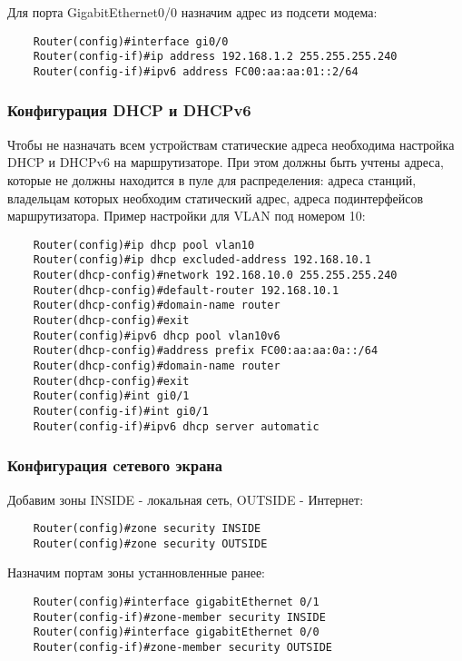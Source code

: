 Для порта GigabitEthernet0/0 назначим адрес из подсети модема:

\begin{lstlisting}
    Router(config)#interface gi0/0
    Router(config-if)#ip address 192.168.1.2 255.255.255.240
    Router(config-if)#ipv6 address FC00:aa:aa:01::2/64
\end{lstlisting}

\subsubsection{Конфигурация DHCP и DHCPv6}

Чтобы не назначать всем устройствам статические адреса необходима настройка DHCP и DHCPv6 на маршрутизаторе.
При этом должны быть учтены адреса, которые не должны находится в пуле для распределения: 
адреса станций, владельцам которых необходим статический адрес, 
адреса подинтерфейсов маршрутизатора. Пример настройки для VLAN под номером 10: 

\begin{lstlisting}
    Router(config)#ip dhcp pool vlan10
    Router(config)#ip dhcp excluded-address 192.168.10.1
    Router(dhcp-config)#network 192.168.10.0 255.255.255.240
    Router(dhcp-config)#default-router 192.168.10.1
    Router(dhcp-config)#domain-name router
    Router(dhcp-config)#exit
    Router(config)#ipv6 dhcp pool vlan10v6
    Router(dhcp-config)#address prefix FC00:aa:aa:0a::/64
    Router(dhcp-config)#domain-name router
    Router(dhcp-config)#exit
    Router(config)#int gi0/1
    Router(config-if)#int gi0/1
    Router(config-if)#ipv6 dhcp server automatic
\end{lstlisting}

\subsubsection{Конфигурация cетевого экрана}
Добавим зоны INSIDE - локальная сеть, OUTSIDE - Интернет:
\begin{lstlisting}
    Router(config)#zone security INSIDE
    Router(config)#zone security OUTSIDE
\end{lstlisting}

Назначим портам зоны устанновленные ранее:
\begin{lstlisting}
    Router(config)#interface gigabitEthernet 0/1
    Router(config-if)#zone-member security INSIDE
    Router(config)#interface gigabitEthernet 0/0
    Router(config-if)#zone-member security OUTSIDE
\end{lstlisting}

